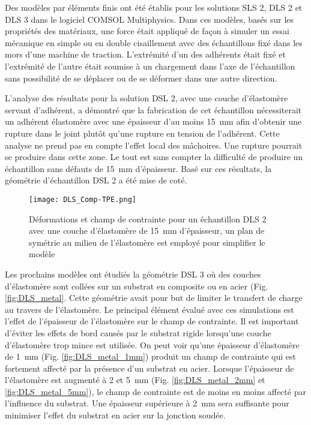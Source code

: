 Des modèles par éléments finis ont été établis pour les solutions SLS 2, DLS 2 et DLS 3 dans le logiciel COMSOL Mul\-ti\-phy\-sics\-\textregistered . 
Dans ces modèles, basés sur les propriétés des matériaux, une force était appliqué de façon à simuler un essai mécanique en simple ou en double cisaillement avec des échantillons fixé dans les mors d'une machine de traction. 
L'extrémité d'un des adhérents était fixé et l'extrémité de l'autre était soumise à un chargement dans l'axe de l'échantillon sans possibilité de se déplacer ou de se déformer dans une autre direction. 

L'analyse des résultats pour la solution DSL 2, avec une couche d'élastomère servant d'adhérent, a démontré que la fabrication de cet échantillon nécessiterait un adhérent élastomère avec une épaisseur d'au moins \SI{15}{\milli\metre} afin d'obtenir une rupture dans le joint plutôt qu'une rupture en tension de l'adhérent. 
Cette analyse ne prend pas en compte l'effet local des mâchoires. 
Une rupture pourrait se produire dans cette zone. 
Le tout est sans compter la difficulté de produire un échantillon sans défauts de \SI{15}{\milli\metre} d'épaisseur. 
Basé sur ces résultats, la géométrie d'échantillon DSL 2 a été mise de coté.

\begin{figure}[h]
	\centering
	\texttt{[image: DLS\_Comp-TPE.png]}
	\caption{Déformations et champ de contrainte pour un échantillon DLS 2 avec une couche d'élastomère de \SI{15}{\milli\metre} d'épaisseur, un plan de symétrie au milieu de l'élastomère est employé pour simplifier le modèle}
	\label{fig:DLS_comp_TPE}
\end{figure}

Les prochains modèles ont étudiés la géométrie DSL 3 où des couches d'élastomère sont collées sur un substrat en composite ou en acier (Fig. \ref{fig:DLS_metal}. 
Cette géométrie avait pour but de limiter le transfert de charge au travers de l'élastomère. 
Le principal élément évalué avec ces simulations est l'effet de l'épaisseur de l'élastomère sur le champ de contrainte. 
Il est important d'éviter les effets de bord causés par le substrat rigide lorsqu'une couche d'élastomère trop mince est utilisée. 
On peut voir qu'une épaisseur d'élastomère de \SI{1}{\milli\metre} (Fig. \ref{fig:DLS_metal_1mm}) produit un champ de contrainte qui est fortement affecté par la présence d'un substrat en acier. 
Lorsque l'épaisseur de l'élastomère est augmenté à 2 et \SI{5}{\milli\metre} (Fig. \ref{fig:DLS_metal_2mm} et \ref{fig:DLS_metal_5mm}), le champ de contrainte est de moins en moins affecté par l'influence du substrat. 
Une épaisseur supérieure à \SI{2}{\milli\metre} sera suffisante pour minimiser l'effet du substrat en acier sur la jonction soudée. 

